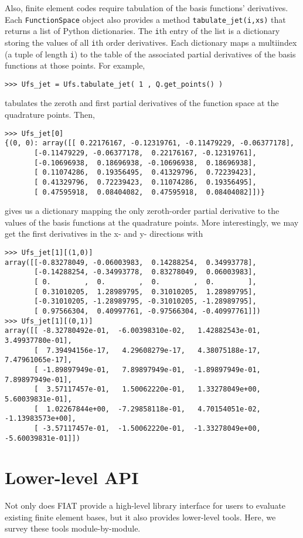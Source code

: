 \documentclass{fenicsmanual}
\begin{document}
Also, finite element codes require tabulation of the basis functions'
derivatives.  Each \verb/FunctionSpace/ object also provides a method
\verb/tabulate_jet(i,xs)/ that returns a list of Python dictionaries.
The \verb.i.th entry of the list is a dictionary storing the values of
all \verb.i.th order derivatives.  Each dictionary maps a multiindex
(a tuple of length \verb.i.) to the table of the associated partial
derivatives of the basis functions at those points.  For example,
\begin{verbatim}
>>> Ufs_jet = Ufs.tabulate_jet( 1 , Q.get_points() )
\end{verbatim}
tabulates the zeroth and first partial derivatives of the function
space at the quadrature points.  Then,
\begin{verbatim}
>>> Ufs_jet[0]
{(0, 0): array([[ 0.22176167, -0.12319761, -0.11479229, -0.06377178],
       [-0.11479229, -0.06377178,  0.22176167, -0.12319761],
       [-0.10696938,  0.18696938, -0.10696938,  0.18696938],
       [ 0.11074286,  0.19356495,  0.41329796,  0.72239423],
       [ 0.41329796,  0.72239423,  0.11074286,  0.19356495],
       [ 0.47595918,  0.08404082,  0.47595918,  0.08404082]])}
\end{verbatim}
gives us a dictionary mapping the only zeroth-order partial derivative
to the values of the basis functions at the quadrature points.  More
interestingly, we may get the first derivatives in the x- and y-
directions with
\begin{verbatim}
>>> Ufs_jet[1][(1,0)]
array([[-0.83278049, -0.06003983,  0.14288254,  0.34993778],
       [-0.14288254, -0.34993778,  0.83278049,  0.06003983],
       [ 0.        ,  0.        ,  0.        ,  0.        ],
       [ 0.31010205,  1.28989795,  0.31010205,  1.28989795],
       [-0.31010205, -1.28989795, -0.31010205, -1.28989795],
       [ 0.97566304,  0.40997761, -0.97566304, -0.40997761]])
>>> Ufs_jet[1][(0,1)] 
array([[ -8.32780492e-01,  -6.00398310e-02,   1.42882543e-01,   3.49937780e-01],
       [  7.39494156e-17,   4.29608279e-17,   4.38075188e-17,   7.47961065e-17],
       [ -1.89897949e-01,   7.89897949e-01,  -1.89897949e-01,   7.89897949e-01],
       [  3.57117457e-01,   1.50062220e-01,   1.33278049e+00,   5.60039831e-01],
       [  1.02267844e+00,  -7.29858118e-01,   4.70154051e-02,  -1.13983573e+00],
       [ -3.57117457e-01,  -1.50062220e-01,  -1.33278049e+00,  -5.60039831e-01]])
\end{verbatim}

\chapter{Lower-level API}
Not only does FIAT provide a high-level library interface for users to
evaluate existing finite element bases, but it also provides
lower-level tools.  Here, we survey these tools module-by-module.
\end{document}
